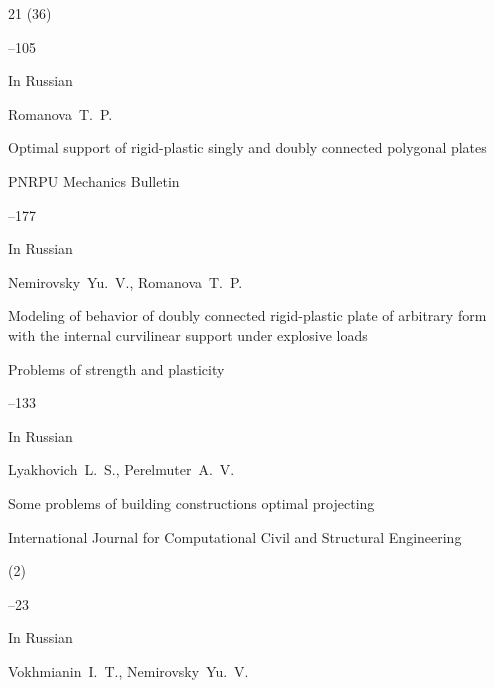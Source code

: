\begin{thebibliography}{21}
(36)

--105







\lang In Russian

\by Romanova~T.~P.

\paper Optimal support of rigid-plastic singly and doubly connected polygonal plates

\jour PNRPU Mechanics Bulletin



--177







\lang In Russian

\by Nemirovsky~Yu.~V., Romanova~T.~P.

\paper Modeling of behavior of doubly connected rigid-plastic plate of arbitrary form with the internal curvilinear support under explosive loads

\jour Problems of strength and plasticity



--133








\lang In Russian

\by Lyakhovich~L.~S., Perelmuter~A.~V.

\paper Some problems of building constructions optimal projecting

\jour International Journal for Computational Civil and Structural Engineering


(2)

--23








\lang In Russian

\by Vokhmianin~I.~T., Nemirovsky~Yu.~V.


\end{thebibliography}
